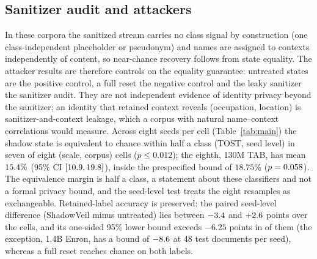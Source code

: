 \documentclass[conference]{IEEEtran}
\begin{document}
\begin{table}[t]
\caption{Revocation methods side by side (130M, TAB). Identity recovery is the strongest attacker's accuracy (chance 12.5\%); work at the deadline is the cost of producing the revoked state at $T$ for a 256-token window.}
\label{tab:compare}
\centering
{}
\end{table}

\subsection{Sanitizer audit and attackers}\label{sec:audit}
In these corpora the sanitized stream carries no class signal by construction (one class-independent placeholder or pseudonym) and names are
assigned to contexts independently of content, so near-chance recovery follows from state equality. The attacker results are therefore controls on the
equality guarantee: untreated states are the positive control, a full reset the negative control and the leaky sanitizer the sanitizer audit. They are
not independent evidence of identity privacy beyond the sanitizer; an identity that retained context reveals (occupation, location) is sanitizer-and-context
leakage, which a corpus with natural name--context correlations would measure. Across eight seeds per cell
(Table~\ref{tab:main}) the shadow state is equivalent to chance within half a class (TOST, seed level) in seven of eight (scale, corpus)
cells ($p\le0.012$); the eighth, 130M TAB, has mean $15.4\%$ (95\% CI $[10.9,19.8]$), inside the prespecified bound of
$18.75\%$ ($p=0.058$). The equivalence margin is half a class, a statement about these classifiers and not a formal privacy bound, and the seed-level test treats the
eight resamples as exchangeable. Retained-label accuracy is preserved: the paired seed-level difference (ShadowVeil minus untreated) lies between $-3.4$ and $+2.6$ points over the
\nRetCells{} cells, and its one-sided 95\% lower bound exceeds $-6.25$ points in \nRetNIOk{} of them (the exception, 1.4B Enron, has a bound of $-8.6$ at 48 test documents per seed), whereas a full reset
reaches chance on both labels.
\end{document}
